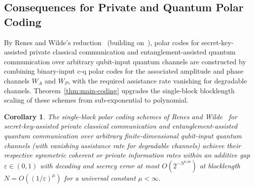 \documentclass[10pt,a4paper]{article}
\numberwithin{equation}{section}
\theoremstyle{plain}
\newtheorem{corollary}[theorem]{Corollary}
\theoremstyle{definition}
\theoremstyle{remark}
\begin{document}
\subsection{Consequences for Private and Quantum Polar Coding}

By Renes and Wilde's reduction~\cite{RenesWilde2014} (building on~\cite{RenesDupuisRenner2012,WildeGuha2013Degradable}), polar codes for secret-key-assisted private classical communication and entanglement-assisted quantum communication over arbitrary qubit-input quantum channels are constructed by combining binary-input c-q polar codes for the associated amplitude and phase channels $W_A$ and $W_P$, with the required assistance rate vanishing for degradable channels. Theorem~\ref{thm:main-coding} upgrades the single-block blocklength scaling of these schemes from sub-exponential to polynomial.

\begin{corollary}\label{cor:private-quantum}
The single-block polar coding schemes of Renes and Wilde~\cite{RenesWilde2014} for secret-key-assisted private classical communication and entanglement-assisted quantum communication over arbitrary finite-dimensional qubit-input quantum channels (with vanishing assistance rate for degradable channels) achieve their respective symmetric coherent or private information rates within an additive gap $\varepsilon \in (0,1)$ with decoding and secrecy error at most $O(2^{-N^{0.49}})$ at blocklength $N = O((1/\varepsilon)^{\mu})$ for a universal constant $\mu < \infty$.
\end{corollary}
\end{document}

